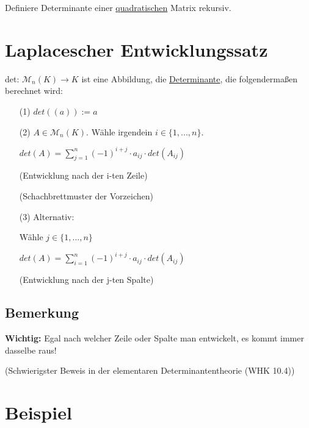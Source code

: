\documentclass[a4paper, openany]{book}
\begin{document}
        Definiere Determinante einer \underline{quadratischen} Matrix rekursiv.

        \section{Laplacescher Entwicklungssatz}

        det: $\mathcal{M}_n(K) \rightarrow K$ ist eine Abbildung, die \underline{Determinante}, die folgendermaßen berechnet wird:

        \begin{itemize}
          \item[(1)] $det((a)) := a$
          \item[(2)] $A \in \mathcal{M}_n(K)$. Wähle irgendein $i \in \{1,...,n\}$.

          $det(A) = \sum_{j=1}^n (-1)^{i+j} \cdot a_{ij} \cdot det(A_{ij})$

          (Entwicklung nach der i-ten Zeile)

          (Schachbrettmuster der Vorzeichen)

          \item[(3)] Alternativ: 

          Wähle $j \in \{1,...,n\}$

          $det(A) = \sum_{i=1}^n (-1)^{i+j} \cdot a_{ij} \cdot det(A_{ij})$

          (Entwicklung nach der j-ten Spalte)
        \end{itemize}

        \subsection{Bemerkung}

        \textbf{Wichtig:} Egal nach welcher Zeile oder Spalte man entwickelt, es kommt immer dasselbe raus!

        \par \medskip

        (Schwierigster Beweis in der elementaren Determinantentheorie (WHK 10.4))


        \section{Beispiel}
\end{document}
